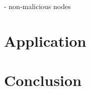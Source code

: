 \documentclass[10pt,journal,compsoc]{IEEEtran}
\begin{document}
- non-malicious nodes

\section{Application}
\label{sec.app}

\section{Conclusion}
\label{sec.conclusion}

\end{document}

